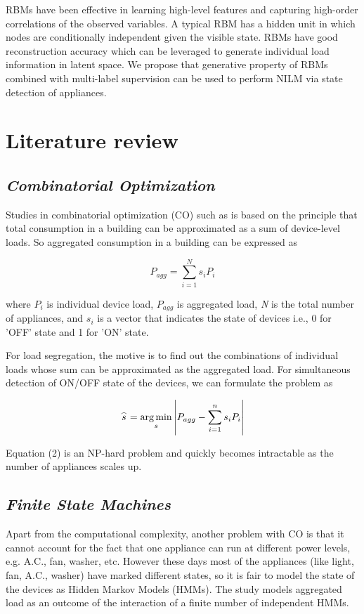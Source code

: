 \documentclass{article}
\begin{document}
RBMs \cite{Smolensky1986} have been effective in learning high-level features and capturing high-order correlations of the observed variables. A typical RBM has a hidden unit in which nodes are conditionally independent given the visible state. RBMs have good reconstruction accuracy which can be leveraged to generate individual load information in latent space. We propose that generative property of RBMs combined with multi-label supervision can be used to perform NILM via state detection of appliances.

\section{Literature review}

\subsection{\textit{ Combinatorial Optimization }}

Studies in combinatorial optimization (CO) such as \cite{hart1992nonintrusive} is based on the principle that total consumption in a building can be approximated as a sum of device-level loads. So aggregated consumption in a building can be expressed as

\begin{equation}
    {P_{agg}} = \sum\limits_{i = 1}^N {{s_i}{P_i}}
\end{equation}

 where \textit{$P_i$} is individual device load, \textit{$P_{agg}$} is aggregated load,  \textit{N} is the total number of appliances,  and \textit{$s_i$} is a vector that indicates the state of devices i.e., 0 for 'OFF' state and 1 for 'ON' state.

For load segregation, the motive is to find out the combinations of individual loads whose sum can be approximated as the aggregated load.  For simultaneous detection of ON/OFF state of the devices, we can formulate the problem as

\begin{equation}
 \mathord{\buildrel{\lower3pt\hbox{$\scriptscriptstyle\frown$}}
\over s}  = \mathop {\arg \min }\limits_s \left| {P_{agg} - \sum\limits_{i = 1}^n {{s_i}{P_i}} } \right|
\end{equation}

 Equation (2) is an NP-hard problem and quickly becomes intractable as the number of appliances scales up. 


\subsection{\textit{ Finite State Machines }}
Apart from the computational complexity, another problem with CO is that it cannot account for the fact that one appliance can run at different power levels, e.g. A.C., fan, washer, etc. However these days most of the appliances (like light, fan, A.C., washer) have marked different states, so it is fair to model the state of the devices as Hidden Markov Models (HMMs). The study \cite{kim2011unsupervised} models aggregated load as an outcome of the interaction of a finite number of independent HMMs.
\end{document}
